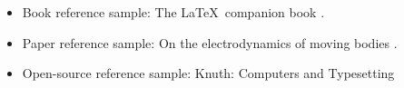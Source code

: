 \documentclass{book}
\begin{document}
\begin{itemize}
    \item Book reference sample: The \LaTeX\ companion book \autocite{latexcompanion}.
    \item Paper reference sample: On the electrodynamics of moving bodies \textcite{einstein}.
    \item Open-source reference sample: Knuth: Computers and Typesetting \parencite{knuthwebsite}
\end{itemize}

\printbibliography
\end{document}
